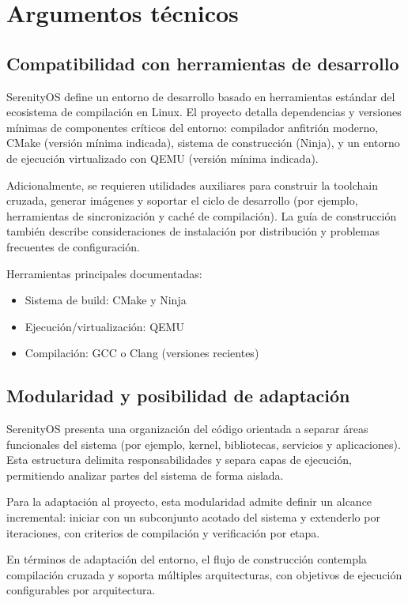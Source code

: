 \section{Argumentos técnicos}
\subsection{Compatibilidad con herramientas de desarrollo}
SerenityOS define un entorno de desarrollo basado en herramientas estándar del ecosistema de compilación en Linux. El proyecto detalla dependencias y versiones mínimas de componentes críticos del entorno: compilador anfitrión moderno, CMake (versión mínima indicada), sistema de construcción (Ninja), y un entorno de ejecución virtualizado con QEMU (versión mínima indicada).

Adicionalmente, se requieren utilidades auxiliares para construir la toolchain cruzada, generar imágenes y soportar el ciclo de desarrollo (por ejemplo, herramientas de sincronización y caché de compilación). La guía de construcción también describe consideraciones de instalación por distribución y problemas frecuentes de configuración.

Herramientas principales documentadas:
\begin{itemize}
	\item Sistema de build: CMake y Ninja
	\item Ejecución/virtualización: QEMU
	\item Compilación: GCC o Clang (versiones recientes)
\end{itemize}

\subsection{Modularidad y posibilidad de adaptación}
SerenityOS presenta una organización del código orientada a separar áreas funcionales del sistema (por ejemplo, kernel, bibliotecas, servicios y aplicaciones). Esta estructura delimita responsabilidades y separa capas de ejecución, permitiendo analizar partes del sistema de forma aislada.

Para la adaptación al proyecto, esta modularidad admite definir un alcance incremental: iniciar con un subconjunto acotado del sistema y extenderlo por iteraciones, con criterios de compilación y verificación por etapa.

En términos de adaptación del entorno, el flujo de construcción contempla compilación cruzada y soporta múltiples arquitecturas, con objetivos de ejecución configurables por arquitectura.

